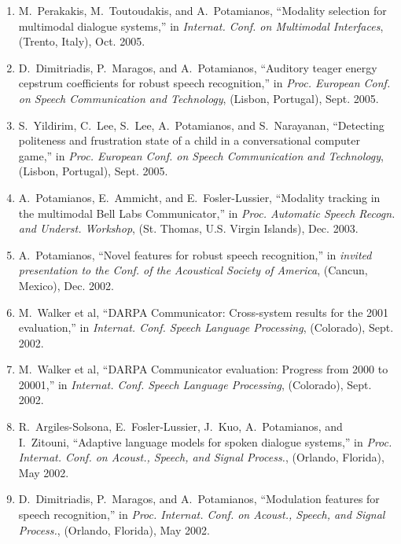 \begin{enumerate}
\item
M.~Perakakis, M.~Toutoudakis, and A.~Potamianos, ``Modality selection for
  multimodal dialogue systems,'' in {\em Internat. Conf. on Multimodal
  Interfaces}, (Trento, Italy), Oct. 2005.

\item
D.~Dimitriadis, P.~Maragos, and A.~Potamianos, ``Auditory teager energy
  cepstrum coefficients for robust speech recognition,'' in {\em Proc. European
  Conf. on Speech Communication and Technology}, (Lisbon, Portugal), Sept.
  2005.

\item
S.~Yildirim, C.~Lee, S.~Lee, A.~Potamianos, and S.~Narayanan, ``Detecting
  politeness and frustration state of a child in a conversational computer
  game,'' in {\em Proc. European Conf. on Speech Communication and Technology},
  (Lisbon, Portugal), Sept. 2005.

\item
A.~Potamianos, E.~Ammicht, and E.~Fosler-Lussier, ``Modality tracking in the
  multimodal {B}ell {L}abs {C}ommunicator,'' in {\em Proc. Automatic Speech
  Recogn. and Underst. Workshop}, (St. Thomas, U.S. Virgin Islands), Dec. 2003.

\item
A.~Potamianos, ``Novel features for robust speech recognition,'' in {\em
  invited presentation to the Conf. of the Acoustical Society of America},
  (Cancun, Mexico), Dec. 2002.

\item
M.~{Walker et al}, ``{DARPA} {C}ommunicator: Cross-system results for the 2001
  evaluation,'' in {\em Internat. Conf. Speech Language Processing},
  (Colorado), Sept. 2002.

\item
M.~{Walker et al}, ``{DARPA} {C}ommunicator evaluation: Progress from 2000 to
  20001,'' in {\em Internat. Conf. Speech Language Processing}, (Colorado),
  Sept. 2002.

\item
R.~Argiles-Solsona, E.~Fosler-Lussier, J.~Kuo, A.~Potamianos, and I.~Zitouni,
  ``Adaptive language models for spoken dialogue systems,'' in {\em Proc.
  Internat. Conf. on Acoust., Speech, and Signal Process.}, (Orlando, Florida),
  May 2002.

\item
D.~Dimitriadis, P.~Maragos, and A.~Potamianos, ``Modulation features for speech
  recognition,'' in {\em Proc. Internat. Conf. on Acoust., Speech, and Signal
  Process.}, (Orlando, Florida), May 2002.


\end{enumerate}

